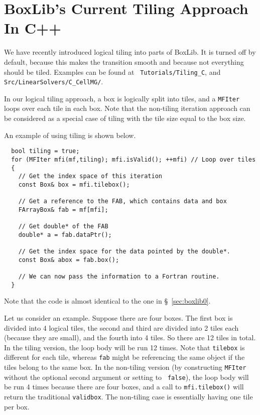 \section{BoxLib's Current Tiling Approach In C++}
\label{sec:boxlib1}

We have recently introduced logical tiling into parts of BoxLib.  It
is turned off by default, because this makes the transition smooth and
because not everything should be tiled.  Examples can be found at {\tt
  Tutorials/Tiling\_C}, and {\tt Src/LinearSolvers/C\_CellMG/}.

In our logical tiling approach, a box is logically split into tiles,
and a {\tt MFIter} loops over each tile in each box.  Note that the
non-tiling iteration approach can be considered as a special case of
tiling with the tile size equal to the box size.

An example of using tiling is shown below.

\begin{lstlisting}
  bool tiling = true;
  for (MFIter mfi(mf,tiling); mfi.isValid(); ++mfi) // Loop over tiles
  {
    // Get the index space of this iteration
    const Box& box = mfi.tilebox(); 

    // Get a reference to the FAB, which contains data and box  
    FArrayBox& fab = mf[mfi];  

    // Get double* of the FAB 
    double* a = fab.dataPtr();

    // Get the index space for the data pointed by the double*.
    const Box& abox = fab.box();

    // We can now pass the information to a Fortran routine.
  }
\end{lstlisting}
Note that the code is almost identical to the one in \S~\ref{sec:boxlib0}.

Let us consider an example.  Suppose there are four boxes.  The first
box is divided into 4 logical tiles, the second and third are divided
into 2 tiles each (because they are small), and the fourth into 4 tiles.
So there are 12 tiles in total.  In the tiling version, the loop body
will be run 12 times.  Note that {\tt tilebox} is different for each
tile, whereas {\tt fab} might be referencing the same object if the tiles
belong to the same box.  In the non-tiling version (by constructing
{\tt MFIter} without the optional second argument or setting to {\tt
  false}), the loop body will be run 4 times because there are four
boxes, and a call to {\tt mfi.tilebox()} will return the traditional
{\tt validbox}.  The non-tiling case is essentially having one tile
per box.

